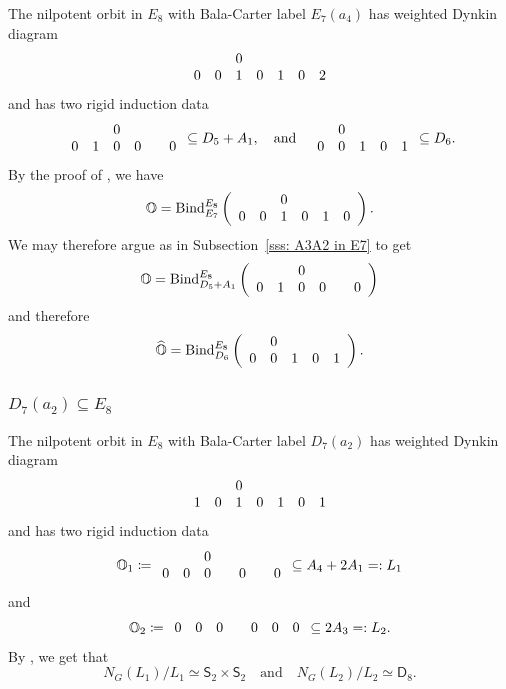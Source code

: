 \documentclass[11pt]{amsart}
\renewcommand{\O}{{\mathbb O}}
\newcommand{\Dih}{{\mathsf{D}}}
\newcommand{\Sym}{{\mathsf{S}}}
\newcommand{\BInd}{{{\mbox{\rm Bind}}}}
\newcommand{\hatO}{\widehat{\O}}
\numberwithin{equation}{section}
\begin{document}
	The nilpotent orbit in $E_8$ with Bala-Carter label $E_7(a_4)$ has weighted Dynkin diagram
	$$\begin{array}{c c c c c c c}
		& & 0 & & & & \\
		0 & 0 & 1 & 0 & 1 & 0 & 2\\
	\end{array}$$ and has two rigid induction data $$\begin{array}{c c c c c c}
		& & 0 & & & \\
		0 & 1 & 0 & 0 & & 0  \\
	\end{array}\subseteq D_5+ A_1,\quad\mbox{and}\quad \begin{array}{c c c c c}
		& 0 & &  &\\
		0 & 0 & 1 & 0 & 1\\
	\end{array}\subseteq D_6.$$
	By the proof of \cite[Proposition 3.1]{Fu}, we have $$\O=\BInd_{E_7}^{E_8}\left(\begin{array}{c c c c c c c}
		& & 0 & & & \\
		0 & 0 & 1 & 0 & 1 & 0 \\
	\end{array}\right).$$ We may therefore argue as in Subsection~\ref{sss: A3A2 in E7} to get 
	$$\O= \BInd_{D_5+A_1}^{E_8}\left(\begin{array}{c c c c c c}
		& & 0 & & & \\
		0 & 1 & 0 & 0 & & 0  \\
	\end{array}\right)$$ and therefore 
	$$\hatO= \BInd_{D_6}^{E_8}\left(\begin{array}{c c c c c}
		& 0 &  & &\\
		0 & 0 & 1 & 0 & 1\\
	\end{array}\right).$$
	
	
	\subsubsection{\texorpdfstring{$D_7(a_2)\subseteq E_8$}{D7a2 in E8}}\label{sss: D7a2 in E8}
	
	The nilpotent orbit in $E_8$ with Bala-Carter label $D_7(a_2)$ has weighted Dynkin diagram
	$$\begin{array}{c c c c c c c}
		& & 0 & & & & \\
		1 & 0 & 1 & 0 & 1 & 0 & 1\\
	\end{array}$$ and has two rigid induction data $$\O_1\coloneqq\begin{array}{c c c c c c c}
		& & 0 & & & & \\
		0 & 0 & 0 & & 0& & 0  \\
	\end{array}\subseteq A_4 + 2 A_1=:L_1$$ and $$\O_2\coloneqq\begin{array}{c c c c c c c}
		0 & 0 & 0 & & 0 & 0 & 0\\
	\end{array}\subseteq 2 A_3=: L_2.$$ By \cite{How}, we get that $$N_G(L_1)/L_1\simeq \Sym_2 \times \Sym_2 \quad\mbox{and}\quad N_G(L_2)/L_2\simeq \Dih_8.$$
	
\end{document}
